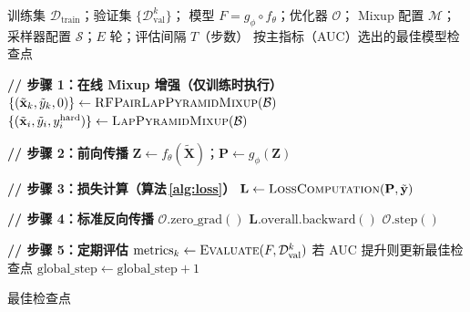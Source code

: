 \documentclass[12pt]{article}
\begin{document}

\begin{algorithm}[p]
\caption{训练主循环（每 epoch）}
\label{alg:train}
\begin{algorithmic}[1]\footnotesize
\Require
  训练集 $\mathcal{D}_{\text{train}}$；验证集 $\{\mathcal{D}_{\text{val}}^k\}$；
  模型 $F = g_\phi \circ f_\theta$；优化器 $\mathcal{O}$；
  Mixup 配置 $\mathcal{M}$；采样器配置 $\mathcal{S}$；$E$ 轮；评估间隔 $T$（步数）
\Ensure
  按主指标（AUC）选出的最佳模型检查点


    \State \textbf{// 步骤 1：在线 Mixup 增强（仅训练时执行）}
        \State $\{(\tilde{\mathbf{x}}_k, \tilde{y}_k, 0)\} \gets \textsc{RFPairLapPyramidMixup}(\mathcal{B})$ 
      \Else
        \State $\{(\tilde{\mathbf{x}}_i, \tilde{y}_i, y^{\text{hard}}_i)\} \gets \textsc{LapPyramidMixup}(\mathcal{B})$ 
      \EndIf
    \EndIf

    \State \textbf{// 步骤 2：前向传播}
    \State $\mathbf{Z} \gets f_\theta(\tilde{\mathbf{X}})$；\quad $\mathbf{P} \gets g_\phi(\mathbf{Z})$

    \State \textbf{// 步骤 3：损失计算（算法\,\ref{alg:loss}）}
    \State $\mathbf{L} \gets \textsc{LossComputation}(\mathbf{P}, \tilde{\mathbf{y}})$

    \State \textbf{// 步骤 4：标准反向传播}
    \State $\mathcal{O}.\text{zero\_grad}()$
    \State $\mathbf{L}.\text{overall}.\text{backward}()$
    \State $\mathcal{O}.\text{step}()$

    \State \textbf{// 步骤 5：定期评估}
        \State $\text{metrics}_k \gets \textsc{Evaluate}(F, \mathcal{D}_{\text{val}}^k)$
        \State 若 AUC 提升则更新最佳检查点
      \EndFor
    \EndIf
    \State $\text{global\_step} \gets \text{global\_step} + 1$

  \EndFor
\EndFor
\State \Return 最佳检查点
\end{algorithmic}
\end{algorithm}
\end{document}
